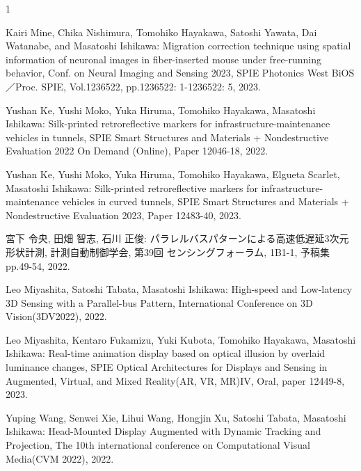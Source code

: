 \begin{査読付}{1}


Kairi Mine, Chika Nishimura, Tomohiko Hayakawa, Satoshi Yawata, Dai Watanabe, and Masatoshi Ishikawa: Migration correction technique using spatial information of neuronal images in fiber-inserted mouse under free-running behavior, Conf. on Neural Imaging and Sensing 2023, SPIE Photonics West BiOS／Proc. SPIE, Vol.1236522, pp.1236522: 1-1236522: 5, 2023.

Yushan Ke, Yushi Moko, Yuka Hiruma, Tomohiko Hayakawa, Masatoshi Ishikawa: Silk-printed retroreflective markers for infrastructure-maintenance vehicles in tunnels, SPIE Smart Structures and Materials + Nondestructive Evaluation 2022 On Demand (Online), Paper 12046-18, 2022.

Yushan Ke, Yushi Moko, Yuka Hiruma, Tomohiko Hayakawa, Elgueta Scarlet, Masatoshi Ishikawa: Silk-printed retroreflective markers for infrastructure-maintenance vehicles in curved tunnels, SPIE Smart Structures and Materials + Nondestructive Evaluation 2023, Paper 12483-40, 2023.


宮下 令央, 田畑 智志, 石川 正俊: パラレルバスパターンによる高速低遅延3次元形状計測, 計測自動制御学会, 第39回 センシングフォーラム, 1B1-1, 予稿集 pp.49-54, 2022.

Leo Miyashita, Satoshi Tabata, Masatoshi Ishikawa: High-speed and Low-latency 3D Sensing with a Parallel-bus Pattern, International Conference on 3D Vision(3DV2022), 2022.

Leo Miyashita, Kentaro Fukamizu, Yuki Kubota, Tomohiko Hayakawa, Masatoshi Ishikawa: Real-time animation display based on optical illusion by overlaid luminance changes, SPIE Optical Architectures for Displays and Sensing in Augmented, Virtual, and Mixed Reality(AR, VR, MR)IV, Oral, paper 12449-8, 2023.


Yuping Wang, Senwei Xie, Lihui Wang, Hongjin Xu, Satoshi Tabata, Masatoshi Ishikawa: Head-Mounted Display Augmented with Dynamic Tracking and Projection, The 10th international conference on Computational Visual Media(CVM 2022), 2022.





\end{査読付}
